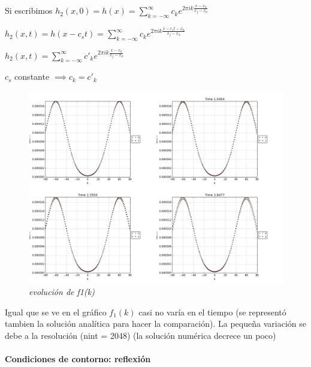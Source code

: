 \documentclass{article}
\begin{document}
\begin{description}
\item Si escribimos   $h_2(x,0) = h(x) = \sum_{k=-\infty}^{\infty}c_k e^{2 \pi i k \frac{x-x_0}{x_f-x_0}}$ 
\item $h_2(x,t) = h(x-c_s t) = \sum_{k=-\infty}^{\infty}c_k e^{2 \pi i k \frac{x-c_s t-x_0}{x_f-x_0}}$ 
\item $h_2(x,t)  = \sum_{k=-\infty}^{\infty}c\prime_k e^{2 \pi i k \frac{x-x_0}{x_f-x_0}}$
\item $c_s$ constante $\implies c_k = c\prime_k$  

\item \begin{figure}[!ht]
 \centering
 \includegraphics[scale=0.2]{fourhom.png}
 \caption{\emph{evolución de f1(k)}}
\end{figure}
\item Igual que se ve en el gráfico $f_1(k) $ casi no varía en el tiempo (se representó tambien la solución analítica para hacer la comparación).
La pequeña variación se debe a la resolución (nint = 2048) (la solución numérica decrece un poco)


\end{description}

\paragraph{Condiciones de contorno: reflexión}
\end{document}
